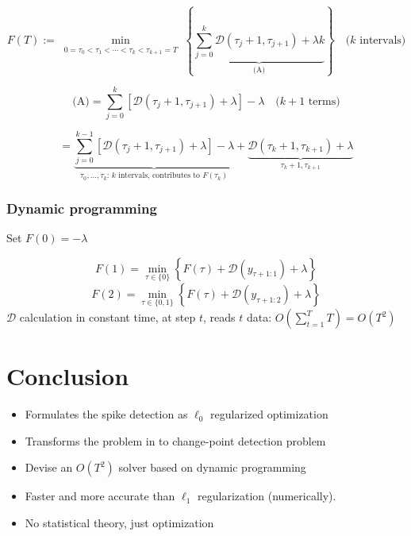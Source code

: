 \documentclass[20pt]{beamer}
\theoremstyle{definition}
\begin{document}
\begin{frame}
	\footnotesize
	\[
	F(T) := \min_{\substack{0 = \tau_0 < \tau_1 < \cdots < \tau_k < \tau_{k+1} = T}} 
	\left\{ 
	\underbrace{
		\sum_{j=0}^{k} \mathcal{D}(\tau_j+1, \tau_{j+1}) + \lambda k
	}_{\text{(A)}}
	\right\}
	\quad \text{($k$ intervals)}
	\]
	
	\[
	\text{(A)} =
	\sum_{j=0}^{k} \left[ \mathcal{D}(\tau_j+1, \tau_{j+1}) + \lambda \right] - \lambda
	\quad \text{($k+1$ terms)}
	\]
	
	\[
	= \underbrace{
		\sum_{j=0}^{k-1} \left[ \mathcal{D}(\tau_j+1, \tau_{j+1}) + \lambda \right] - \lambda
	}_{\text{$\tau_0, \ldots, \tau_k$: $k$ intervals, contributes to } F(\tau_k)}
	+ \underbrace{\mathcal{D}(\tau_k+1, \tau_{k+1}) + \lambda}_{\text{$\tau_k+1, \tau_{k+1}$}}
	\]
\end{frame}


\begin{frame}
	\frametitle{Dynamic programming}
	\small
Set $F(0) = -\lambda$ 

\[
F(1) = \min_{\tau \in \{0\}} \left\{ F(\tau) + \mathcal{D}(y_{\tau+1:1}) + \lambda \right\} 
\]
\[
F(2) = \min_{\tau \in \{0,1\}} \left\{ F(\tau) + \mathcal{D}(y_{\tau+1:2}) + \lambda \right\}
\]
$\mathcal{D}$ calculation in constant time, at  step $t$, reads  $t$ data: $O(\sum_{t=1}^T T) = O(T^2)$
\end{frame}

\section{Conclusion}
\begin{frame}
	\begin{itemize}
		\item Formulates the spike detection as $\ell_0$ regularized optimization
		\item Transforms the problem in to change-point detection problem
		\item Devise an $O(T^2)$ solver based on dynamic programming
		\item Faster and more accurate than $\ell_1$ regularization (numerically).
		\item No statistical theory, just optimization
	\end{itemize}
\end{frame}

%
%



\end{document}
